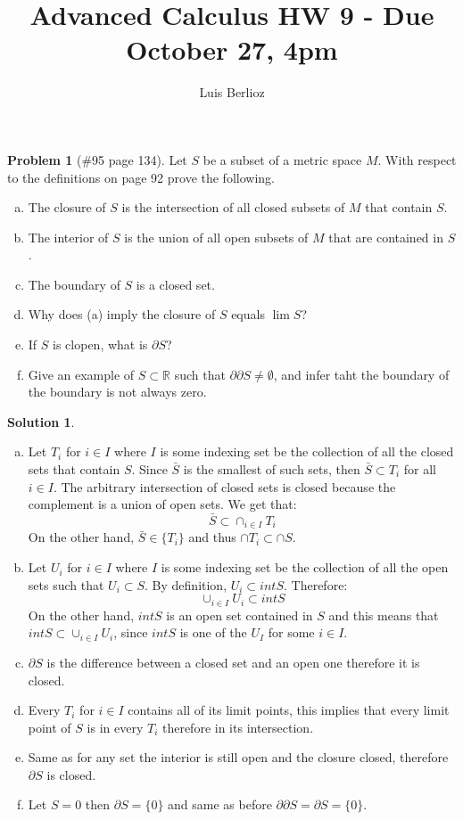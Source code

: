 \documentclass{article}
\theoremstyle{definition}
\newtheorem*{soln}{Solution}
\newtheorem*{prob}{Problem}
\theoremstyle{theorem}
\newcommand{\R}{\mathbb{R}}
\newcommand{\E}{\mathbb{\emptyset}}
\begin{document}
\title{Advanced Calculus HW 9 - Due October 27, 4pm}
\author{Luis Berlioz}
\maketitle



\begin{prob}[\#95 page 134]
    Let $S$ be a subset of a metric space $M$. With respect to the definitions on page 92 prove the following.
    \begin{enumerate}[(a)]
        \item The closure of $S$ is the intersection of all closed subsets of $M$ that contain $S$.
        \item The interior of $S$ is the union of all open subsets of $M$ that are contained in $S$.
        \item The boundary of $S$ is a closed set.
        \item Why does (a) imply the closure of $S$ equals $\lim S$?
        \item If $S$ is clopen, what is $\partial S$?
        \item Give an example of $S\subset \R$ such that $\partial\partial S\neq \E$, and infer taht the boundary of the boundary is not always zero.
    \end{enumerate}
\end{prob}
\begin{soln}
    \begin{enumerate}[(a)]
        \item Let $T_i$ for $i\in I$ where $I$ is some indexing set be the collection of all the closed sets that contain $S$. Since $\bar S$ is the smallest of such sets, then $\bar S\subset T_i$ for all $i\in I$. The arbitrary intersection of closed sets is closed because the complement is a union of open sets. We get that:
            $$\bar S \subset \cap_{i\in I } T_i$$
            On the other hand, $\bar S\in\{T_i  \}$ and thus $\cap T_i\subset \cap S$.
        \item Let $U_i$ for $i \in I$ where $I$ is some indexing set be the collection of all the open sets such that  $U_i \subset S$. By definition, $U_i \subset int S$. Therefore:
            $$\cup_{i\in I }U_i \subset int S$$
            On the other hand, $int S $ is an open set contained in $S$ and this means that $int S \subset \cup_{i\in I }U_i $, since $int S$ is one of the $U_I$ for some $i \in I$.
        \item $\partial S$ is the difference between a closed set and an open one therefore it is closed.
        \item Every $T_i$ for $i\in I$ contains all of its limit points, this implies that every limit point of $S$ is in every $T_i$ therefore in its intersection.
        \item Same as for any set the interior is still open and the closure closed, therefore $\partial S$ is closed.
        \item Let $S={0}$ then $\partial S = \{0  \}$ and same as before $\partial\partial S= \partial S = \{0  \}$.
    \end{enumerate}
\end{soln}
\end{document}
